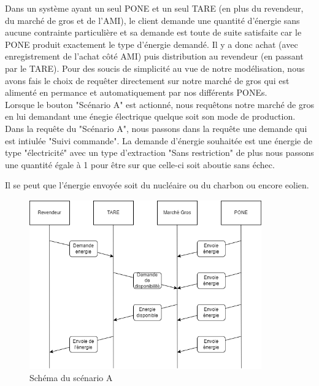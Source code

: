 Dans un système ayant un seul PONE et un seul TARE (en plus du revendeur, du marché de gros et de l'AMI), le client demande une quantité d'énergie sans aucune contrainte particulière et sa demande est toute de suite satisfaite car le PONE produit exactement le type d'énergie demandé. Il y a donc achat (avec enregistrement de l'achat côté AMI) puis distribution au revendeur (en passant par le TARE).
Pour des soucis de simplicité au vue de notre modélisation, nous avons fais le choix
de requêter directement sur notre marché de gros qui est alimenté en permance et automatiquement par nos différents PONEs.
\\[1cm]
Lorsque le bouton "Scénario A" est actionné, nous requêtons notre marché de gros en lui demandant une énegie électrique quelque soit
son mode de production. Dans la requête du "Scénario A", nous passons dans la requête une demande qui est intiulée "Suivi commande". La demande d'énergie souhaitée est une énergie de type "électricité" avec un type d'extraction "Sans restriction" de plus nous passons une quantité égale à 1 pour être sur que celle-ci soit aboutie sans échec.

Il se peut que l'énergie envoyée soit du nucléaire ou du charbon ou encore eolien.

\begin{figure}[h]
    \centering
    \includegraphics[width=100mm, height=73mm]{images/ScenarioA.png}
    \caption{Schéma du scénario A}
    \label{img:mesh21}
\end{figure}

\newpage
